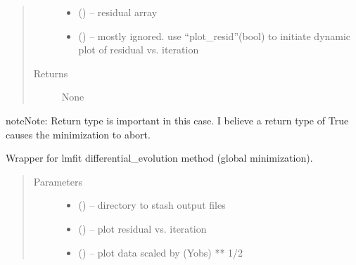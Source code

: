 \documentclass[letterpaper,10pt,english]{sphinxmanual}
\begin{document}
\begin{fulllineitems}
\begin{fulllineitems}
\begin{quote}
\begin{description}
\begin{itemize}
\item {} 
 () -- residual array

\item {} 
 () -- mostly ignored. use ``plot\_resid''(bool) to initiate
dynamic plot of residual vs. iteration

\end{itemize}

\item[{Returns}] \leavevmode
None

\end{description}\end{quote}

\begin{sphinxadmonition}{note}{Note:}
Return type is important in this case. I believe a return type of
True causes the minimization to abort.
\end{sphinxadmonition}

\end{fulllineitems}


\begin{fulllineitems}
\label{\detokenize{rst/pairdistributionfunction:mstack.pairdistributionfunction.PdfRefinement.diffev_minimize}}
Wrapper for lmfit differential\_evolution method (global minimization).
\begin{quote}\begin{description}
\item[{Parameters}] \leavevmode\begin{itemize}
\item {} 
 () -- directory to stash output files

\item {} 
 () -- plot residual vs. iteration

\item {} 
 () -- plot data scaled by (Yobs) ** 1/2


\end{itemize}
\end{description}
\end{quote}
\end{fulllineitems}
\end{fulllineitems}
\end{document}
